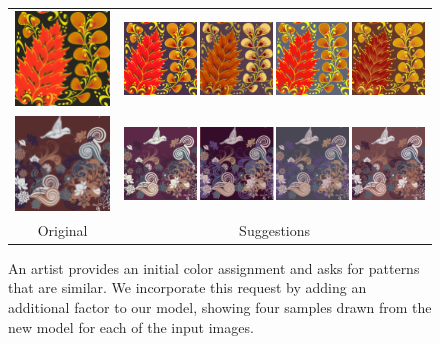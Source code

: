 
\begin{figure}[t]
\begin{tabular}{cc}
{\includegraphics[width=.1785\columnwidth]{figs/guidedSearch1Original}}&\includegraphics[width=.735\columnwidth]{figs/guidedSearch1MMR}\vspace{0.5em}\\
{\includegraphics[width=.1785\columnwidth]{figs/guidedSearch0Original}}&\includegraphics[width=.735\columnwidth]{figs/guidedSearch0MMR}\vspace{0.5em}\\
Original&Suggestions\\
\end{tabular}

\caption{An artist provides an initial color assignment and asks for patterns that are similar. We incorporate this request by adding an additional factor to our model, showing four samples drawn from the new model for each of the input images.}
\label{fig:nearbySuggestions}
\vspace{-1.0em}
\end{figure}

